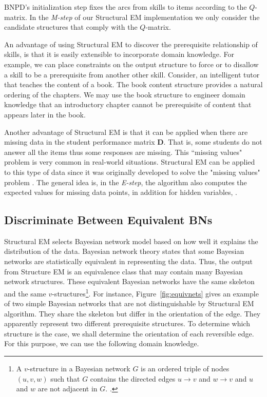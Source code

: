 \documentclass{edm_template}
\begin{document}
BNPD's  initialization step
fixes the arcs from skills to items according to the ${Q}$-matrix.
In  the \emph{M-step} of our Structural EM implementation we only consider the candidate structures that comply with the ${Q}$-matrix.

An advantage of using Structural EM to discover the prerequisite relationship of skills, is that it is easily extensible to incorporate domain knowledge.
For example, we can  place constraints on the output structure to force or to disallow a skill to be a prerequisite from another other skill.
Consider,  an intelligent tutor that teaches the content of a book. 
The book content structure provides a natural ordering of the chapters. 
We may use the book structure to engineer domain knowledge that an introductory chapter cannot be prerequisite of content that appears later in the book.

Another advantage of Structural EM is that it can be applied when there are missing data in the student performance matrix $\mathbf{D}$. 
That is, some students do not answer all the items thus some responses are missing. This ``missing values" problem is very common in real-world situations.
Structural EM can be applied to this type of data since it was originally developed to solve the "missing values" problem \cite{friedman1997learning}.
The general idea is, in the \emph{E-step}, the algorithm also computes the expected values for missing data points, in addition for hidden variables, . 

\subsection{Discriminate Between Equivalent BNs}

Structural EM selects Bayesian network model based on how well it explains the distribution of the data. 
Bayesian network theory states that some Bayesian networks are statistically equivalent in representing the data.
Thus, the output from Structure EM is an equivalence class that may contain many Bayesian network structures.
These equivalent Bayesian networks have the same skeleton and the same $v$-structures\footnote{
A $v$-structure in a Bayesian network $G$ is an ordered triple of nodes $(u,v,w)$ such that $G$ contains the directed edges $u\rightarrow v$ and $w\rightarrow v$ and $u$ and $w$ are not adjacent in $G$. \cite{verma1990equivalence}.}. 
For instance, Figure~\ref{fig:equivnets} gives an example of two simple Bayesian networks that are not distinguishable by Structural EM algorithm.
They share the skeleton but differ in the orientation of the edge. They apparently represent two different prerequisite structures.
To determine which structure is the case, we shall determine the orientation of each reversible edge.
For this purpose, we can use the following domain knowledge.
\end{document}
